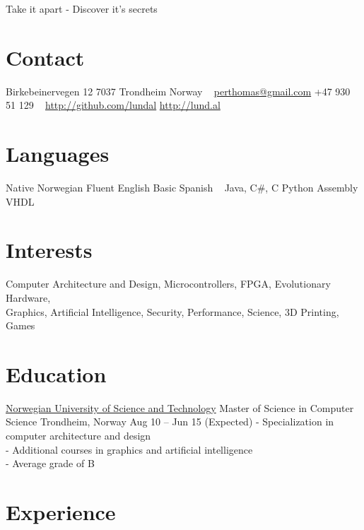 \documentclass[print]{friggeri-cv}
\begin{document}
       {Take it apart - Discover it's secrets}


\begin{aside}
    \section{Contact}
        Birkebeinervegen 12
        7037 Trondheim
        Norway
        ~
        \href{mailto:perthomas@gmail.com}{perthomas@gmail.com}
        +47 930 51 129
        ~
        \href{http://github.com/lundal}{http://github.com/lundal}
        \href{http://lund.al}{http://lund.al}
    \section{Languages}
        Native Norwegian
        Fluent English
        Basic Spanish
        ~
        Java, C\#, C
        Python
        Assembly
        VHDL
\end{aside}

\section{Interests}

Computer Architecture and Design,
Microcontrollers,
FPGA,
Evolutionary Hardware,
\\
Graphics,
Artificial Intelligence,
Security,
Performance,
Science,
3D Printing,
Games

\section{Education}

\begin{entrylist}
    \entryx
        {\href{http://ntnu.no/}{Norwegian University of Science and Technology}}
        {Master of Science in Computer Science}
        {Trondheim, Norway}
        {Aug 10 – Jun 15 (Expected)}
        {- Specialization in computer architecture and design\\
         - Additional courses in graphics and artificial intelligence\\
         - Average grade of B}
\end{entrylist}

\section{Experience}
\end{document}
